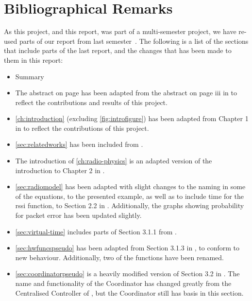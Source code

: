 \chapter{Bibliographical Remarks}
As this project, and this report, was part of a multi-semester project, we have re-used parts of
our report from last semester~\cite{paper:massivesims1}. The following is a list of the sections that include
parts of the last report, and the changes that has been made to them in this report:

\begin{itemize}
    \item Summary
    \item The abstract on page \pageref{page:titlepage} has been adapted from the abstract on page iii in
          \cite{paper:massivesims1} to reflect the contributions and results of this project.
    \item \autoref{ch:introduction} (excluding \autoref{fig:introfigure}) has been adapted from Chapter 1 in
          \cite{paper:massivesims1} to reflect the contributions of this project.
    \item \autoref{sec:relatedworks} has been included from \cite{paper:massivesims1}.
    \item The introduction of \autoref{ch:radio-physics} is an adapted version of the introduction to Chapter
          2 in \cite{paper:massivesims1}.
    \item \autoref{sec:radiomodel} has been adapted with slight changes to the naming in some of the
          equations, to the presented example, as well as to include time for the \gls{rssi} function, to
          Section 2.2 in \cite{paper:massivesims1}. Additionally, the graphs showing probability for packet
          error has been updated slightly.
    \item \autoref{sec:virtual-time} includes parts of Section 3.1.1 from \cite{paper:massivesims1}.
    \item \autoref{sec:hwfuncspseudo} has been adapted from Section 3.1.3 in \cite{paper:massivesims1}, to
          conform to new behaviour. Additionally, two of the functions have been renamed.
    \item \autoref{sec:coordinatorpseudo} is a heavily modified version of Section 3.2 in
          \cite{paper:massivesims1}. The name and functionality of the Coordinator has changed greatly from
          the Centralised Controller of \cite{paper:massivesims1}, but the Coordinator still has basis in this
          section.
\end{itemize}